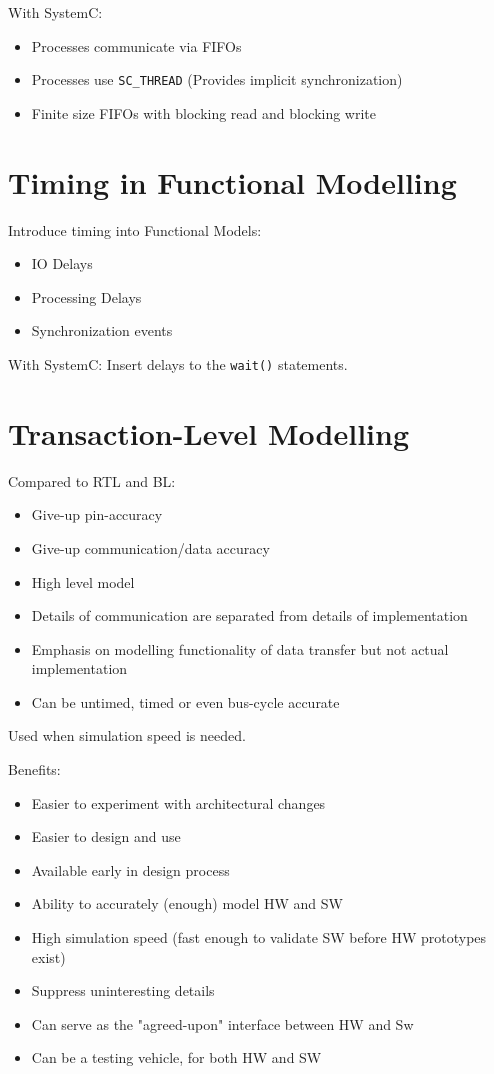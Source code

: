 With SystemC:
\begin{itemize}
    \item Processes communicate via FIFOs
    \item Processes use \lstinline{SC_THREAD} (Provides implicit synchronization)
    \item Finite size FIFOs with blocking read and blocking write
\end{itemize}

\section{Timing in Functional Modelling}
Introduce timing into Functional Models:
\begin{itemize}
    \item IO Delays
    \item Processing Delays
    \item Synchronization events 
\end{itemize}

With SystemC: Insert delays to the \lstinline{wait()} statements.

\section{Transaction-Level Modelling}
Compared to RTL and BL:
\begin{itemize}
    \item Give-up pin-accuracy
    \item Give-up communication/data accuracy
    \item High level model
    \item Details of communication are separated from details of implementation
    \item Emphasis on modelling functionality of data transfer but not actual implementation
    \item Can be untimed, timed or even bus-cycle accurate
\end{itemize}
Used when simulation speed is needed.

Benefits:
\begin{itemize}
    \item Easier to experiment with architectural changes
    \item Easier to design and use
    \item Available early in design process
    \item Ability to accurately (enough) model HW and SW
    \item High simulation speed (fast enough to validate SW before HW prototypes exist)
    \item Suppress uninteresting details
    \item Can serve as the "agreed-upon" interface between HW and Sw
    \item Can be a testing vehicle, for both HW and SW
\end{itemize}

